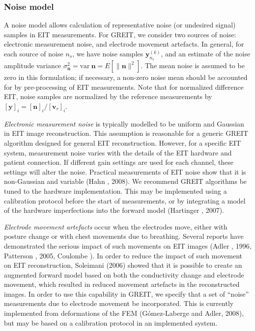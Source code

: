\documentclass[12pt]{iopart}
\newcommand{\vB}{\mbox{$\mathbf{v}$}}
\newcommand{\nB}{\mbox{$\mathbf{n}$}}
\newcommand{\yB}{\mbox{$\mathbf{y}$}}
\begin{document}
\subsubsection{Noise model}

A noise model allows calculation of representative 
noise (or undesired signal) samples in EIT measurements.
For GREIT, we consider two sources of noise:
electronic measurement noise, and
electrode movement artefacts. In general, for each
source of noise $n_s$, we have noise samples $\yB^{(k)}_{n_s}$,
and an estimate of the noise amplitude variance
 $\sigma_{\nB}^2 = \mathrm{var}~\nB = E[ \| \nB \|^2 ]$. 
The mean noise is assumed to be zero in this formulation;
if necessary, a non-zero noise mean should be accounted for
by pre-processing of EIT measurements.
Note that for normalized difference EIT,
noise samples are normalized by the
reference measurements by $[\yB]_i = [\nB ]_i / [\vB_r]_i$.

{\em Electronic measurement noise}
is typically modelled to be uniform and Gaussian in EIT
image reconstruction. This assumption is reasonable for
a generic GREIT algorithm designed for general EIT reconstruction.
However, for a specific EIT system, measurement noise
varies with the details of the EIT hardware and patient
connection. If different gain settings are used for each
channel, these settings will alter the noise. Practical
measurements of EIT noise show that it is non-Gaussian and
variable (Hahn \etal, 2008). We recommend GREIT algorithms
be tuned to the hardware implementation. This may be 
implemented using a calibration protocol before the 
start of measurements, or by integrating a model of 
the hardware imperfections into the forward model
(Hartinger \etal, 2007).

{\em Electrode movement artefacts}
occur when the electrodes move, either with posture change
or with chest movements due to breathing. Several reports
have demonstrated the serious impact of such movements on
EIT images (Adler \etal, 1996, Patterson \etal, 2005,
Coulombe ). In order to reduce the impact
of such movement on EIT reconstruction, Soleimani \etal
(2006) showed that it is possible to create an
augmented forward model based on both the conductivity change
and electrode movement, which resulted in reduced movement 
artefacts in the reconstructed images. In order
to use this capability in GREIT, we specify that a
set of ``noise'' measurements due to electrode movement 
be incorporated. This is currently implemented from
deformations of the FEM (G\'omez-Laberge and Adler, 2008),
but may be based on a calibration protocol in an
implemented system.
\end{document}
